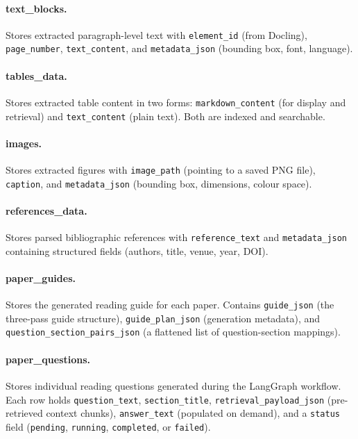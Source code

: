 \documentclass[12pt,a4paper]{report}
\begin{document}
\paragraph{text\_blocks.}
Stores extracted paragraph-level text with \texttt{element\_id} (from
Docling), \texttt{page\_number}, \texttt{text\_content}, and
\texttt{metadata\_json} (bounding box, font, language).

\paragraph{tables\_data.}
Stores extracted table content in two forms: \texttt{markdown\_content} (for
display and retrieval) and \texttt{text\_content} (plain text). Both are
indexed and searchable.

\paragraph{images.}
Stores extracted figures with \texttt{image\_path} (pointing to a saved PNG
file), \texttt{caption}, and \texttt{metadata\_json} (bounding box,
dimensions, colour space).

\paragraph{references\_data.}
Stores parsed bibliographic references with \texttt{reference\_text} and
\texttt{metadata\_json} containing structured fields (authors, title, venue,
year, DOI).

\paragraph{paper\_guides.}
Stores the generated reading guide for each paper. Contains
\texttt{guide\_json} (the three-pass guide structure),
\texttt{guide\_plan\_json} (generation metadata), and
\texttt{question\_section\_pairs\_json} (a flattened list of question-section
mappings).

\paragraph{paper\_questions.}
Stores individual reading questions generated during the LangGraph workflow.
Each row holds \texttt{question\_text}, \texttt{section\_title},
\texttt{retrieval\_payload\_json} (pre-retrieved context chunks),
\texttt{answer\_text} (populated on demand), and a \texttt{status} field
(\texttt{pending}, \texttt{running}, \texttt{completed}, or
\texttt{failed}).
\end{document}
